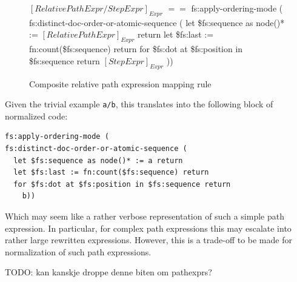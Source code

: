 \begin{figure}[!h]
\centering
$[RelativePathExpr / StepExpr]_{Expr}$ \newline
$==$ \newline
fs:apply-ordering-mode ( \newline
fs:distinct-doc-order-or-atomic-sequence ( \newline
    let \$fs:sequence as node()* := $[RelativePathExpr]_{Expr}$ return \newline
    let \$fs:last := fn:count(\$fs:sequence) return \newline
    for \$fs:dot at \$fs:position in \$fs:sequence return \newline
       $[StepExpr]_{Expr}$
))
  \caption{Composite relative path expression mapping rule}
  \label{figure:xquery:relpath_mapping_rule}
\end{figure}

Given the trivial example \verb!a/b!, this translates into the following block
of normalized code:

\begin{verbatim}
fs:apply-ordering-mode (
fs:distinct-doc-order-or-atomic-sequence (
  let $fs:sequence as node()* := a return
  let $fs:last := fn:count($fs:sequence) return
  for $fs:dot at $fs:position in $fs:sequence return
    b))
\end{verbatim}

Which may seem like a rather verbose representation of such a simple path
expression. In particular, for complex path expressions this may
escalate into rather large rewritten expressions. However, this is a trade-off
to be made for normalization of such path expressions.

TODO: kan kanskje droppe denne biten om pathexprs?

